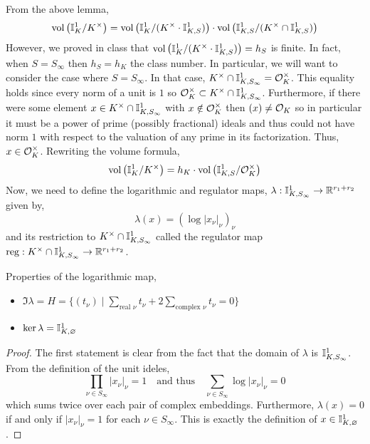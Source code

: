 \documentclass[12pt]{extarticle}
\begin{document}
\begin{enumerate}
From the above lemma, 
\begin{equation}
\mathrm{vol}\left( \mathbb{I}^1_{K}/K^\times \right) = \mathrm{vol}\left( \mathbb{I}^1_{K} / (K^\times \cdot \mathbb{I}^1_{K, S}) \right) \cdot \mathrm{vol}\left( \mathbb{I}^1_{K, S} / (K^\times \cap \mathbb{I}^1_{K, S}) \right)
\end{equation}
However, we proved in class that $\mathrm{vol}\left( \mathbb{I}^1_{K} / (K^\times \cdot \mathbb{I}^1_{K, S}) \right) = h_S$ is finite. In fact, when $S = S_{\infty}$ then $h_S = h_K$ the class number. In particular, we will want to consider the case where $S = S_\infty$. In that case, $K^\times \cap \mathbb{I}^1_{K, S_\infty} = \mathcal{O}_{K}^\times$. This equality holds since every norm of a unit is $1$ so $\mathcal{O}_{K}^\times \subset K^\times \cap \mathbb{I}^1_{K, S_\infty}$. Furthermore, if there were some element $x \in K^\times \cap \mathbb{I}^1_{K, S_\infty}$ with $x \notin \mathcal{O}_{K}^\times$ then $(x) \neq \mathcal{O}_{K}$ so in particular it must be a power of prime (possibly fractional) ideals and thus could not have norm $1$ with respect to the valuation of any prime in its factorization. Thus, $x \in \mathcal{O}_{K}^\times$. Rewriting the volume formula, 
\begin{equation} \label{master}
\mathrm{vol}\left( \mathbb{I}^1_{K}/K^\times \right) = h_K \cdot \mathrm{vol}\left( \mathbb{I}^1_{K, S} / \mathcal{O}_{K}^\times \right) 
\end{equation}
Now, we need to define the logarithmic and regulator maps, $\lambda : \mathbb{I}^1_{K, S_\infty} \to \mathbb{R}^{r_1 + r_2}$ given by,
\[ \lambda(x) = (\log{|x_\nu|_\nu})_\nu\]
and its restriction to $K^\times \cap \mathbb{I}^1_{K, S_\infty}$ called the regulator map $\mathrm{reg} : K^\times \cap \mathbb{I}^1_{K, S_\infty} \to \mathbb{R}^{r_1 + r_2}$.

\begin{lemma}
Properties of the logarithmic map,
\begin{itemize}
\item $\Im{\lambda} = H = \{(t_\nu) \mid \sum\limits_{\text{real }\nu} t_\nu + 2 \sum\limits_{\text{complex }\nu} t_\nu = 0\}$ 
\item $\ker{\lambda} = \mathbb{I}^1_{K, \varnothing}$
\end{itemize}
\end{lemma}

\begin{proof}
The first statement is clear from the fact that the domain of $\lambda$ is $\mathbb{I}^1_{K, S_\infty}$. From the definition of the unit ideles,
\[\prod_{\nu \in S_\infty} |x_\nu|_\nu = 1 \quad \text{and thus} \quad \sum_{\nu \in S_{\infty}} \log{|x_\nu|_\nu}  = 0\]
which sums twice over each pair of complex embeddings. Furthermore, $\lambda(x) = 0$ if and only if $|x_\nu|_\nu = 1$ for each $\nu \in S_\infty$. This is exactly the definition of $x \in \mathbb{I}^1_{K, \varnothing}$. 
\end{proof}


\end{enumerate}
\end{document}
